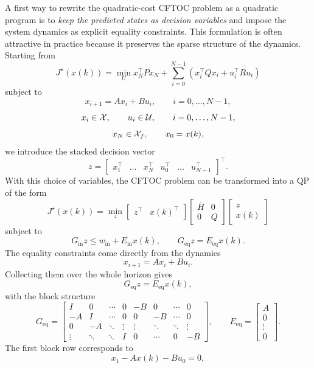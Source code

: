 A first way to rewrite the quadratic-cost CFTOC problem as a quadratic program is to
\emph{keep the predicted states as decision variables} and impose the system dynamics as
explicit equality constraints. This formulation is often attractive in practice because it preserves
the sparse structure of the dynamics.\\
Starting from
\[
J^\star(x(k))
=
\min_U
x_N^\top P x_N + \sum_{i=0}^{N-1}\left(x_i^\top Q x_i + u_i^\top R u_i\right)
\]
subject to
\[
x_{i+1}=Ax_i+Bu_i,\qquad i=0,\dots,N-1,
\]
\[
x_i\in\mathcal{X},\qquad u_i\in\mathcal{U},\qquad i=0,\dots,N-1,
\]
\[
x_N\in\mathcal{X}_f,\qquad x_0=x(k),
\]
we introduce the stacked decision vector
\[
z=
\begin{bmatrix}
x_1^\top & \dots & x_N^\top & u_0^\top & \dots & u_{N-1}^\top
\end{bmatrix}^\top .
\]
With this choice of variables, the CFTOC problem can be transformed into a QP of the form
\[
J^\star(x(k))
=
\min_z
\begin{bmatrix}
z^\top & x(k)^\top
\end{bmatrix}
\begin{bmatrix}
\bar H & 0\\
0 & Q
\end{bmatrix}
\begin{bmatrix}
z\\
x(k)
\end{bmatrix}
\]
subject to
\[
G_{\mathrm{in}} z \le w_{\mathrm{in}} + E_{\mathrm{in}}x(k),
\qquad
G_{\mathrm{eq}} z = E_{\mathrm{eq}}x(k).
\]
The equality constraints come directly from the dynamics
\[
x_{i+1}=Ax_i+Bu_i.
\]
Collecting them over the whole horizon gives
\[
G_{\mathrm{eq}} z = E_{\mathrm{eq}}x(k),
\]
with the block structure
\[
G_{\mathrm{eq}}=
\begin{bmatrix}
I      & 0      & \cdots & 0      & -B     & 0      & \cdots & 0\\
-A     & I      & \cdots & 0      & 0      & -B     & \cdots & 0\\
0      & -A     & \ddots & \vdots & \vdots & \ddots & \ddots & \vdots\\
\vdots & \ddots & \ddots & I      & 0      & \cdots & 0      & -B
\end{bmatrix},
\qquad
E_{\mathrm{eq}}=
\begin{bmatrix}
A\\
0\\
\vdots\\
0
\end{bmatrix}.
\]
The first block row corresponds to
\[
x_1-Ax(k)-Bu_0=0,
\]
